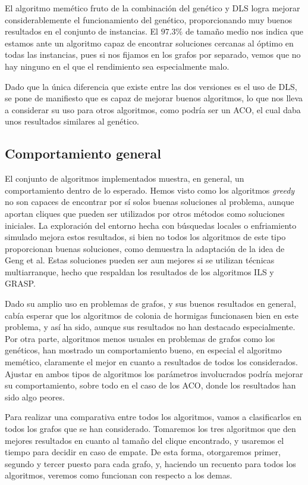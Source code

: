 El algoritmo memético fruto de la combinación del genético y DLS logra mejorar
considerablemente el funcionamiento del genético, proporcionando muy buenos resultados
en el conjunto de instancias. El $97.3\%$ de tamaño medio nos indica que estamos
ante un algoritmo capaz de encontrar soluciones cercanas al óptimo en todas las
instancias, pues si nos fijamos en los grafos por separado, vemos que no hay ninguno
en el que el rendimiento sea especialmente malo.

Dado que la única diferencia que existe entre las dos versiones es el uso de DLS,
se pone de  manifiesto que es capaz de mejorar buenos algoritmos, lo que nos lleva
a considerar su uso para otros algoritmos, como podría ser un ACO, el cual daba
unos resultados similares al genético.

\subsection{Comportamiento general}

El conjunto de algoritmos implementados muestra, en general, un comportamiento dentro de
lo esperado. Hemos visto como los algoritmos \textit{greedy} no son capaces de encontrar
por sí solos buenas soluciones al problema, aunque aportan cliques que pueden ser utilizados
por otros métodos como soluciones iniciales. La exploración del entorno hecha con búsquedas
locales o enfriamiento simulado mejora estos resultados, si bien no todos los algoritmos de
este tipo proporcionan buenas soluciones, como demuestra la adaptación de la idea de Geng
et al. Estas soluciones pueden ser aun mejores si se utilizan técnicas multiarranque,
hecho que respaldan los resultados de los algoritmos ILS y GRASP.

Dado su amplio uso en problemas de grafos, y sus buenos resultados en general, cabía
esperar que los algoritmos de colonia de hormigas funcionasen bien en este problema, y
así ha sido, aunque sus resultados no han destacado especialmente. Por otra parte,
algoritmos menos usuales en problemas de grafos como los genéticos, han mostrado un
comportamiento bueno, en especial el algoritmo memético, claramente el mejor en
cuanto a resultados de todos los considerados. Ajustar en ambos tipos de algoritmos
los parámetros involucrados podría mejorar su comportamiento, sobre todo en el caso
de los ACO, donde los resultados han sido algo peores.

Para realizar una comparativa entre todos los algoritmos, vamos a clasificarlos en
todos los grafos que se han considerado. Tomaremos los tres algoritmos que den mejores
resultados en cuanto al tamaño del clique encontrado, y usaremos el tiempo para decidir
en caso de empate. De esta forma, otorgaremos primer, segundo y tercer puesto para
cada grafo, y, haciendo un recuento para todos los algoritmos, veremos como funcionan
con respecto a los demas.

